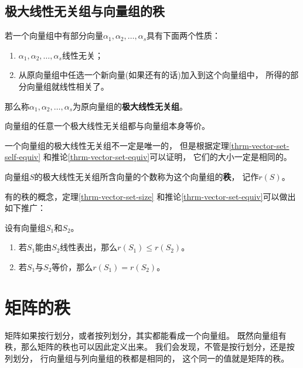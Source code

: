 \subsection{极大线性无关组与向量组的秩}
\begin{definition}
  若一个向量组中有部分向量$\alpha_1,\alpha_2,\dots,\alpha_s$具有下面两个性质：
  \begin{enumerate}
    \item
    $\alpha_1,\alpha_2,\dots,\alpha_s$线性无关；
    \item
    从原向量组中任选一个新向量(如果还有的话)加入到这个向量组中，
    所得的部分向量组就线性相关了。
  \end{enumerate}
  那么称$\alpha_1,\alpha_2,\dots,\alpha_s$为原向量组的\textbf{极大线性无关组}。
\end{definition}

\begin{theorem} \label{thrm-vector-set-self-equiv}
   向量组的任意一个极大线性无关组都与向量组本身等价。
\end{theorem}

\begin{remark}
  一个向量组的极大线性无关组不一定是唯一的，
  但是根据定理\ref{thrm-vector-set-self-equiv}
  和推论\ref{thrm-vector-set-equiv}可以证明，
  它们的大小一定是相同的。
\end{remark}

\begin{definition}[向量组的秩]
  向量组$S$的极大线性无关组所含向量的个数称为这个向量组的\textbf{秩}，
  记作$r(S)$。
\end{definition}

有的秩的概念，定理\ref{thrm-vector-set-size}
和推论\ref{thrm-vector-set-equiv}可以做出如下推广：
\begin{theorem}
  设有向量组$S_1$和$S_2$。
  \begin{enumerate}
    \item
    若$S_1$能由$S_2$线性表出，那么$r(S_1) \le r(S_2)$。
    \item
    若$S_1$与$S_2$等价，那么$r(S_1)=r(S_2)$。
  \end{enumerate}
\end{theorem}

\section{矩阵的秩}
矩阵如果按行划分，或者按列划分，其实都能看成一个向量组。
既然向量组有秩，那么矩阵的秩也可以因此定义出来。
我们会发现，不管是按行划分，还是按列划分，
行向量组与列向量组的秩都是相同的，
这个同一的值就是矩阵的秩。

